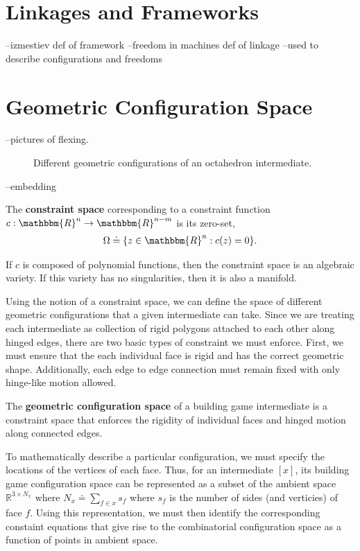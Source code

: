 \section{Linkages and Frameworks}
--izmestiev def of framework
--freedom in machines def of linkage
--used to describe configurations and freedoms 


\section{Geometric Configuration Space}

 --pictures of flexing. 
\begin{figure}[ht]
\caption{Different geometric configurations of an octahedron intermediate.}
\label{fig:OctaGCS}
\end{figure}
--embedding

\begin{mydef}
The \textbf{constraint space} corresponding to a constraint function $c: \mathbbm{R}^n \to \mathbbm{R}^{n-m}$ is its zero-set,
\begin{align}
\Omega \doteq \{z \in \mathbbm{R}^n : c(z) = 0\}.
\end{align}
\end{mydef}
If $c$ is composed of polynomial functions, then the constraint space is an algebraic variety. If this variety has no singularities, then it is also a manifold. 

Using the notion of a constraint space, we can define the space of different geometric configurations that a given intermediate can take. Since we are treating each intermediate as collection of rigid polygons attached to each other along hinged edges, there are two basic types of constraint we must enforce. First, we must ensure that the each individual face is rigid and has the correct geometric shape. Additionally, each edge to edge connection must remain fixed with only hinge-like motion allowed. 
   
\begin{mydef}
The \textbf{geometric configuration space} of a building game intermediate is a constraint space that enforces the rigidity of individual faces and hinged motion along connected edges.
\end{mydef}

To mathematically describe a particular configuration, we must specify the locations of the vertices of each face. Thus, for an intermediate $[x]$, its building game configuration space can be represented as a subset of the ambient space $\mathbb{R}^{3\times N_x}$ where $N_x \doteq \sum_{f\in x} s_f$ where $s_f$ is the number of sides (and verticies) of face $f$. Using this representation, we must then identify the corresponding constaint equations that give rise to the combinatorial configuration space as a function of points in ambient space. 


